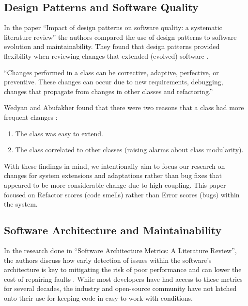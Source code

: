 \subsection{Design Patterns and Software Quality}

In the paper ``Impact of design patterns on software quality: a systematic literature review'' the authors compared the use of design patterns to software evolution and maintainability. They found that design patterns provided flexibility when reviewing changes that extended (evolved) software \cite{wedyan:2020}.

\vspace{0.25cm}
\begin{displayquote}
  ``Changes performed in a class can be corrective, adaptive, perfective, or preventive. These changes can occur due to new requirements, debugging, changes that propagate from changes in other classes and refactoring.''
\end{displayquote}
\vspace{0.25cm}

Wedyan and Abufakher found that there were two reasons that a class had more frequent changes \cite{wedyan:2020}:

\vspace{0.25cm}
\begin{enumerate}
    \item The class was easy to extend.
    \item The class correlated to other classes (raising alarms about class modularity).
\end{enumerate}
\vspace{0.25cm}

With these findings in mind, we intentionally aim to focus our research on changes for system extensions and adaptations rather than bug fixes that appeared to be more considerable change due to high coupling. This paper focused on Refactor scores (code smells) rather than Error scores (bugs) within the system.

\subsection{Software Architecture and Maintainability}

In the research done in ``Software Architecture Metrics: A Literature Review'', the authors discuss how early detection of issues within the software's architecture is key to mitigating the risk of poor performance and can lower the cost of repairing faults \cite{coulin:2019}. While most developers have had access to these metrics for several decades, the industry and open-source community have not latched onto their use for keeping code in easy-to-work-with conditions.

